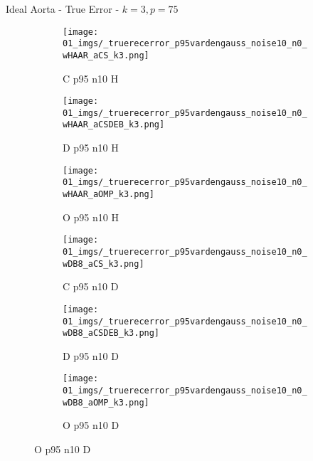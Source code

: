 \begin{frame}{Ideal Aorta - True Error - $k=3,p=75$}{}
\begin{figure}
\begin{subfigure}{0.13\textwidth}
\texttt{[image: 01\_imgs/\_truerecerror\_p95vardengauss\_noise10\_n0\_wHAAR\_aCS\_k3.png]}
\caption*{\tiny C p95 n10 H}
\end{subfigure}
\begin{subfigure}{0.13\textwidth}
\texttt{[image: 01\_imgs/\_truerecerror\_p95vardengauss\_noise10\_n0\_wHAAR\_aCSDEB\_k3.png]}
\caption*{\tiny D p95 n10 H}
\end{subfigure}
\begin{subfigure}{0.13\textwidth}
\texttt{[image: 01\_imgs/\_truerecerror\_p95vardengauss\_noise10\_n0\_wHAAR\_aOMP\_k3.png]}
\caption*{\tiny O p95 n10 H}
\end{subfigure}
\begin{subfigure}{0.13\textwidth}
\texttt{[image: 01\_imgs/\_truerecerror\_p95vardengauss\_noise10\_n0\_wDB8\_aCS\_k3.png]}
\caption*{\tiny C p95 n10 D}
\end{subfigure}
\begin{subfigure}{0.13\textwidth}
\texttt{[image: 01\_imgs/\_truerecerror\_p95vardengauss\_noise10\_n0\_wDB8\_aCSDEB\_k3.png]}
\caption*{\tiny D p95 n10 D}
\end{subfigure}
\begin{subfigure}{0.13\textwidth}
\texttt{[image: 01\_imgs/\_truerecerror\_p95vardengauss\_noise10\_n0\_wDB8\_aOMP\_k3.png]}
\caption*{\tiny O p95 n10 D}
\end{subfigure}

\vspace{5pt}


\end{figure}
\end{frame}
